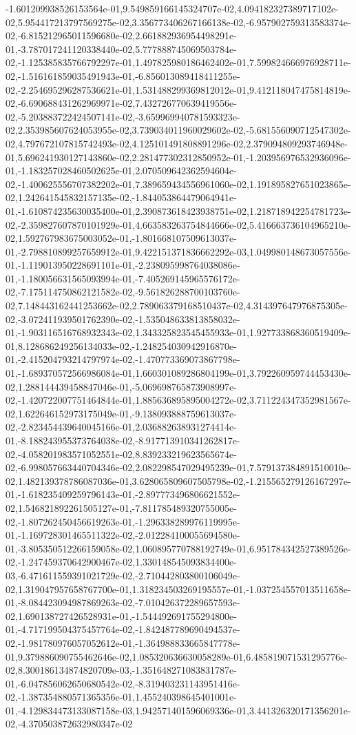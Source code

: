 -1.601209938526153564e-01,9.549859166145324707e-02,4.094182327389717102e-02,5.954417213797569275e-02,3.356773406267166138e-02,-6.957902759313583374e-02,-6.815212965011596680e-02,2.661882936954498291e-01,-3.787017241120338440e-02,5.777888745069503784e-02,-1.125385835766792297e-01,1.497825980186462402e-01,7.599824666976928711e-02,-1.516161859035491943e-01,-6.856013089418411255e-02,-2.254695296287536621e-01,1.531488299369812012e-01,9.412118047475814819e-02,-6.690688431262969971e-02,7.432726770639419556e-02,-5.203883722424507141e-02,-3.659969940781593323e-02,2.353985607624053955e-02,3.739034011960029602e-02,-5.681556090712547302e-02,4.797672107815742493e-02,4.125101491808891296e-02,2.379094809293746948e-01,5.696241930127143860e-02,2.281477302312850952e-01,-1.203956976532936096e-01,-1.183257028460502625e-01,2.070509642362594604e-02,-1.400625556707382202e-01,7.389659434556961060e-02,1.191895827651023865e-02,1.242641545832157135e-02,-1.844053864479064941e-01,-1.610874235630035400e-01,2.390873618423938751e-02,1.218718942254781723e-02,-2.359827607870101929e-01,4.663583263754844666e-02,5.416663736104965210e-02,1.592767983675003052e-01,-1.801668107509613037e-01,-2.798810899257659912e-01,9.422151371836662292e-03,1.049980148673057556e-01,-1.119013950228691101e-01,-2.238095998764038086e-01,-1.180056631565093994e-01,-7.405269145965576172e-02,-7.175114750862121582e-02,-9.561826288700103760e-02,7.148443162441253662e-02,2.789063379168510437e-02,4.314397647976875305e-02,-3.072411939501762390e-02,-1.535048633813858032e-01,-1.903116516768932343e-02,1.343325823545455933e-01,1.927733868360519409e-01,8.128686249256134033e-02,-1.248254030942916870e-01,-2.415204793214797974e-02,-1.470773369073867798e-01,-1.689370572566986084e-01,1.660301089286804199e-01,3.792260959744453430e-02,1.288144439458847046e-01,-5.069698765873908997e-02,-1.420722007751464844e-01,1.885636895895004272e-02,3.711224347352981567e-02,1.622646152973175049e-01,-9.138093888759613037e-02,-2.823454439640045166e-01,2.036882638931274414e-01,-8.188243955373764038e-02,-8.917713910341262817e-02,-4.058201983571052551e-02,8.839233219623565674e-02,-6.998057663440704346e-02,2.082298547029495239e-01,7.579137384891510010e-02,1.482139378786087036e-01,3.628065809607505798e-02,-1.215565279126167297e-01,-1.618235409259796143e-01,-2.897773496806621552e-02,1.546821892261505127e-01,-7.811785489320755005e-02,-1.807262450456619263e-01,-1.296338289976119995e-01,-1.169728301465511322e-02,-2.012284100055694580e-01,-3.805350512266159058e-02,1.060895770788192749e-01,6.951784342527389526e-02,-1.247459370642900467e-02,1.330148545093834400e-03,-6.471611559391021729e-02,-2.710442803800106049e-02,1.319047957658767700e-01,1.318234503269195557e-01,-1.037254557013511658e-01,-8.084423094987869263e-02,-7.010426372289657593e-02,1.690138727426528931e-01,-1.544492691755294800e-01,-4.717199504375457764e-02,-1.842487789690494537e-02,-1.981780976057052612e-01,-1.364988833665847778e-01,9.379886090755462646e-02,1.085320636630058289e-01,6.485819071531295776e-02,8.300186134874820709e-03,-1.351648271083831787e-01,-6.047856062650680542e-02,-8.319403231143951416e-02,-1.387354880571365356e-01,1.455240398645401001e-01,-4.129834473133087158e-03,1.942571401596069336e-01,3.441326320171356201e-02,-4.370503872632980347e-02
